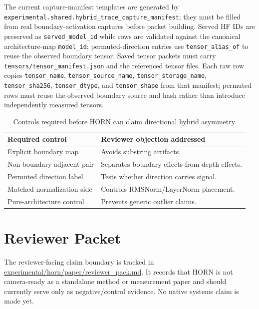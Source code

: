 \documentclass{article}
\begin{document}
The current capture-manifest templates are generated by
\texttt{experimental.shared.hybrid\_trace\_capture\_manifest}; they must be
filled from real boundary-activation captures before packet building. Served HF
IDs are preserved as \texttt{served\_model\_id} while rows are validated
against the canonical architecture-map \texttt{model\_id}; permuted-direction
entries use \texttt{tensor\_alias\_of} to reuse the observed boundary tensor.
Saved tensor packets must carry \texttt{tensors/tensor\_manifest.json} and the
referenced tensor files. Each raw row copies \texttt{tensor\_name},
\texttt{tensor\_source\_name}, \texttt{tensor\_storage\_name},
\texttt{tensor\_sha256}, \texttt{tensor\_dtype}, and \texttt{tensor\_shape}
from that manifest; permuted rows must reuse the observed boundary source and
hash rather than introduce independently measured tensors.

\begin{table}[h]
\centering
\small
\begin{tabular}{ll}
\toprule
Required control & Reviewer objection addressed \\
\midrule
Explicit boundary map & Avoids substring artifacts. \\
Non-boundary adjacent pair & Separates boundary effects from depth effects. \\
Permuted direction label & Tests whether direction carries signal. \\
Matched normalization side & Controls RMSNorm/LayerNorm placement. \\
Pure-architecture control & Prevents generic outlier claims. \\
\bottomrule
\end{tabular}
\caption{Controls required before HORN can claim directional hybrid asymmetry.}
\end{table}

\section{Reviewer Packet}

The reviewer-facing claim boundary is tracked in
\url{experimental/horn/paper/reviewer_pack.md}. It records that HORN is not
camera-ready as a standalone method or measurement paper and should currently
serve only as negative/control evidence. No native systems claim is made yet.
\end{document}
